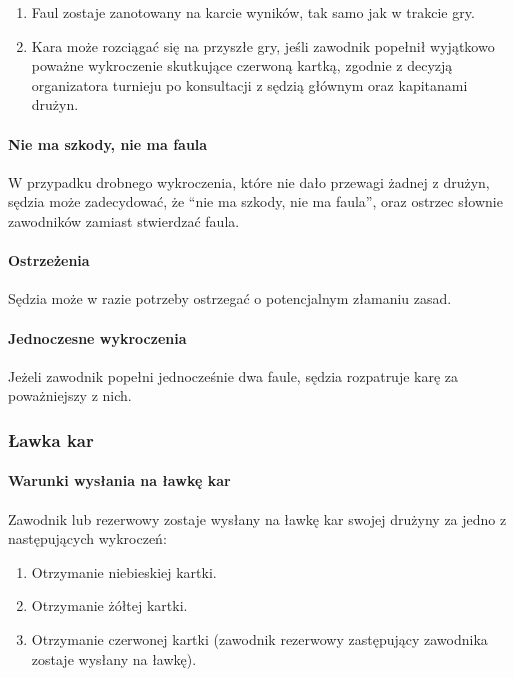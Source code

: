 \documentclass[12pt]{article}
\begin{document}
\begin{enumerate}
	\item Faul zostaje zanotowany na karcie wyników, tak samo jak w trakcie
	      gry.

	\item Kara może rozciągać się na przyszłe gry, jeśli zawodnik popełnił
	      wyjątkowo poważne wykroczenie skutkujące czerwoną kartką, zgodnie z
	      decyzją organizatora turnieju po konsultacji z sędzią głównym oraz
	      kapitanami drużyn.
\end{enumerate}

\paragraph{Nie ma szkody, nie ma faula}
W przypadku drobnego
wykroczenia, które nie dało przewagi żadnej z drużyn, sędzia może
zadecydować, że ``nie ma szkody, nie ma faula'', oraz ostrzec słownie
zawodników zamiast stwierdzać faula.

\paragraph{Ostrzeżenia}
Sędzia może w razie potrzeby ostrzegać
o potencjalnym złamaniu zasad.

\paragraph{Jednoczesne wykroczenia}
Jeżeli zawodnik popełni
jednocześnie dwa faule, sędzia rozpatruje karę za poważniejszy z nich.

\subsubsection{Ławka kar}

\paragraph{Warunki wysłania na ławkę kar}
Zawodnik lub rezerwowy
zostaje wysłany na ławkę kar swojej drużyny za jedno z następujących
wykroczeń:

\begin{enumerate}
	\item Otrzymanie niebieskiej kartki.

	\item Otrzymanie żółtej kartki.

	\item Otrzymanie czerwonej kartki (zawodnik rezerwowy zastępujący zawodnika
	      zostaje wysłany na ławkę).
\end{enumerate}
\end{document}
